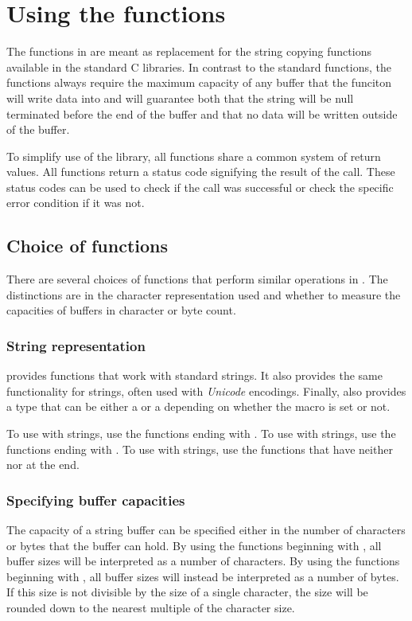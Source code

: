 \section{Using the \strsafe{} functions}
The functions in \strsafe{} are meant as replacement for
the string copying functions available in the standard C libraries.
In contrast to the standard functions,
the functions always require the maximum capacity of any buffer
that the funciton will write data into
and will guarantee both
that the string will be null terminated before the end of the buffer
and that no data will be written outside of the buffer.

To simplify use of the library,
all functions share a common system of return values.
All functions return a status code signifying the result of the call.
These status codes can be used to check if the call was successful
or check the specific error condition if it was not.

\subsection{Choice of functions}
There are several choices of functions
that perform similar operations in \strsafe{}.
The distinctions are in the character representation used
and whether to measure the capacities of buffers
in character or byte count.

\subsubsection{String representation}
\strsafe{} provides functions that work with standard  strings.
It also provides the same functionality for  strings,
often used with \emph{Unicode} encodings.
Finally, \strsafe{} also provides a  type that can be either a
 or a  depending on
whether the macro  is set or not.

To use \strsafe{} with  strings,
use the functions ending with .
To use \strsafe{} with  strings,
use the functions ending with .
To use \strsafe{} with  strings,
use the functions that have neither  nor  at the end.

\subsubsection{Specifying buffer capacities}
The capacity of a string buffer can be specified either in the number of
characters or bytes that the buffer can hold.
By using the functions beginning with ,
all buffer sizes will be interpreted as a number of characters.
By using the functions beginning with ,
all buffer sizes will instead be interpreted as a number of bytes.
If this size is not divisible by the size of a single character,
the size will be rounded down to the nearest multiple of the character size.

